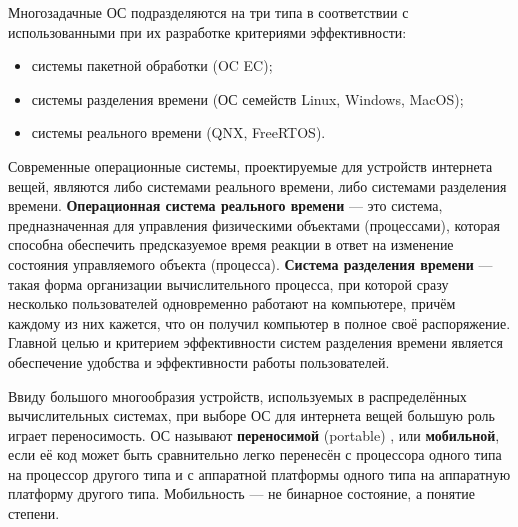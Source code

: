 Многозадачные ОС подразделяются на три типа в соответствии с использованными при их разработке критериями эффективности:
\begin{itemize}[label*=---]
	\item системы пакетной обработки (OC EC);
	\item системы разделения времени (ОС семейств Linux, Windows, MacOS);
	\item системы реального времени (QNX, FreeRTOS).
\end{itemize}
Современные операционные системы, проектируемые для устройств интернета вещей, являются либо системами реального времени, либо системами разделения времени. \textbf{Операционная система реального времени} \cite{Olifer} --- это система, предназначенная для управления физическими объектами (процессами), которая способна обеспечить предсказуемое время реакции в ответ на изменение состояния управляемого объекта (процесса). \textbf{Система разделения времени} \cite{Olifer} --- такая форма организации вычислительного процесса, при которой сразу несколько пользователей одновременно работают на компьютере, причём каждому из них кажется, что он получил компьютер в полное своё распоряжение. Главной целью и критерием эффективности систем разделения времени является обеспечение удобства и эффективности работы пользователей.

Ввиду большого многообразия устройств, используемых в распределённых вычислительных системах, при выборе ОС для интернета вещей большую роль играет переносимость. ОС называют \textbf{переносимой} (portable) \cite{Olifer}, или \textbf{мобильной}, если её код может быть сравнительно легко перенесён с процессора одного типа на процессор другого типа и с аппаратной платформы одного типа на аппаратную платформу другого типа. Мобильность --- не бинарное состояние, а понятие степени.

